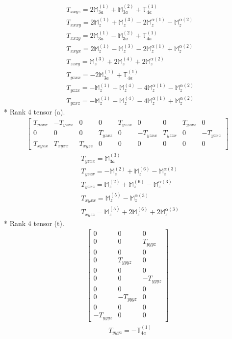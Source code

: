 \documentclass[fleqn,8pt,landscape]{jsarticle}
\begin{document}
\begin{align*}
& T_{xxyz} = 2 \mathbb{M}_{3a}^{(1)} + \mathbb{M}_{3a}^{(2)} + \mathbb{T}_{4a}^{(1)} \\
& T_{xxxy} = 2 \mathbb{M}_{z}^{(1)} + \mathbb{M}_{z}^{(3)} - 2 \mathbb{M}_{z}^{\alpha(1)} - \mathbb{M}_{z}^{\alpha(2)} \\
& T_{xxzy} = 2 \mathbb{M}_{3a}^{(1)} - \mathbb{M}_{3a}^{(2)} + \mathbb{T}_{4a}^{(1)} \\
& T_{xxyx} = 2 \mathbb{M}_{z}^{(1)} - \mathbb{M}_{z}^{(3)} - 2 \mathbb{M}_{z}^{\alpha(1)} + \mathbb{M}_{z}^{\alpha(2)} \\
& T_{zzxy} = \mathbb{M}_{z}^{(3)} + 2 \mathbb{M}_{z}^{(4)} + 2 \mathbb{M}_{z}^{\alpha(2)} \\
& T_{yzxx} = - 2 \mathbb{M}_{3a}^{(1)} + \mathbb{T}_{4a}^{(1)} \\
& T_{yzzx} = - \mathbb{M}_{z}^{(1)} + \mathbb{M}_{z}^{(4)} - 4 \mathbb{M}_{z}^{\alpha(1)} - \mathbb{M}_{z}^{\alpha(2)} \\
& T_{yzxz} = - \mathbb{M}_{z}^{(1)} - \mathbb{M}_{z}^{(4)} - 4 \mathbb{M}_{z}^{\alpha(1)} + \mathbb{M}_{z}^{\alpha(2)}
\end{align*}
* Rank 4 tensor (a).
\begin{align*}
\begin{bmatrix} T_{yzxx} & - T_{yzxx} & 0 & 0 & T_{yzzx} & 0 & 0 & T_{yzxz} & 0 \\ 0 & 0 & 0 & T_{yzxz} & 0 & - T_{yzxx} & T_{yzzx} & 0 & - T_{yzxx} \\ T_{xyxx} & T_{xyxx} & T_{xyzz} & 0 & 0 & 0 & 0 & 0 & 0 \end{bmatrix}
\end{align*}
\begin{align*}
& T_{yzxx} = \mathbb{M}_{3a}^{(3)} \\
& T_{yzzx} = - \mathbb{M}_{z}^{(2)} + \mathbb{M}_{z}^{(6)} - \mathbb{M}_{z}^{\alpha(3)} \\
& T_{yzxz} = \mathbb{M}_{z}^{(2)} + \mathbb{M}_{z}^{(6)} - \mathbb{M}_{z}^{\alpha(3)} \\
& T_{xyxx} = \mathbb{M}_{z}^{(5)} - \mathbb{M}_{z}^{\alpha(3)} \\
& T_{xyzz} = \mathbb{M}_{z}^{(5)} + 2 \mathbb{M}_{z}^{(6)} + 2 \mathbb{M}_{z}^{\alpha(3)}
\end{align*}
* Rank 4 tensor (t).
\begin{align*}
\begin{bmatrix} 0 & 0 & 0 \\ 0 & 0 & T_{yyyz} \\ 0 & 0 & 0 \\ 0 & T_{yyyz} & 0 \\ 0 & 0 & 0 \\ 0 & 0 & - T_{yyyz} \\ 0 & 0 & 0 \\ 0 & - T_{yyyz} & 0 \\ 0 & 0 & 0 \\ - T_{yyyz} & 0 & 0 \end{bmatrix}
\end{align*}
\begin{align*}
& T_{yyyz} = - \mathbb{T}_{4a}^{(1)}
\end{align*}
\end{document}
